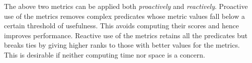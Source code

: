 The above two metrics can be applied both \emph{proactively} and \emph{reactively}.  Proactive use of the metrics removes complex predicates whose metric values fall below a certain threshold of usefulness.  This avoids computing their scores and hence improves performance.  Reactive use of the metrics retains all the predicates but breaks ties by giving higher ranks to those with better values for the metrics. This is desirable if neither computing time nor space is a concern.
